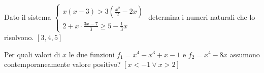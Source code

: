 \begin{esercizio}[\Ast]
\label{ese:4.82}
Dato il sistema \(\left\{\begin{array}{l}{x(x-3)>3\left(\frac{x^2} 
2-2x\right)}\\{2+x\cdot \frac{3x-7} 3\ge 5-\frac 1 3x}\end{array}\right.\) 
determina i numeri naturali che lo risolvono. \hfill \(\left[3, 4, 5\right]\)
\end{esercizio}

\begin{esercizio}[\Ast]
 \label{ese:4.83}
Per quali valori di \( x \) le due funzioni \(f_1=x^4-x^3+x-1\) e \(f_2=x^4-8x\) 
assumono contemporaneamente valore positivo? \hfill \(\left[x<-1\vee x>2\right]\)
\end{esercizio}
